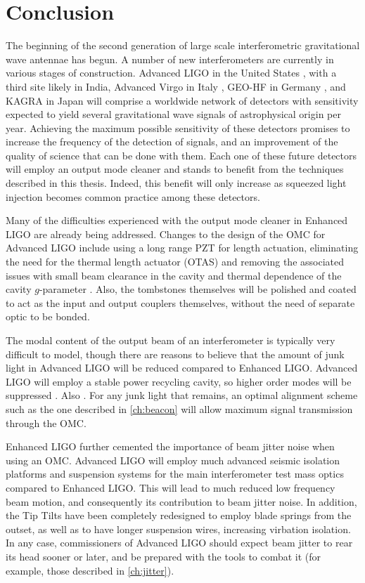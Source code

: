 \chapter{Conclusion}
\label{ch:conclusion}

The beginning of the second generation of large scale interferometric gravitational wave antennae has begun. %
A number of new interferometers are currently in various stages of construction. %
Advanced LIGO in the United States , with a third site likely in India, Advanced Virgo in Italy , GEO-HF in Germany , and KAGRA in Japan  will comprise a worldwide network of detectors with sensitivity expected to yield several gravitational wave signals of astrophysical origin per year. %
Achieving the maximum possible sensitivity of these detectors promises to increase the frequency of the detection of signals, and an improvement of the quality of science that can be done with them. %
Each one of these future detectors will employ an output mode cleaner and stands to benefit from the techniques described in this thesis. %
Indeed, this benefit will only increase as squeezed light injection becomes common practice among these detectors.

Many of the difficulties experienced with the output mode cleaner in Enhanced LIGO are already being addressed. %
Changes to the design of the OMC for Advanced LIGO include using a long range PZT for length actuation, eliminating the need for the thermal length actuator (OTAS) and removing the associated issues with small beam clearance in the cavity and thermal dependence of the cavity $g$-parameter \cite{T1000276,T0900157}. %
Also, the tombstones themselves will be polished and coated to act as the input and output couplers themselves, without the need of separate optic to be bonded. %
 

The modal content of the output beam of an interferometer is typically very difficult to model, though there are reasons to believe that the amount of junk light in Advanced LIGO will be reduced compared to Enhanced LIGO. %
Advanced LIGO will employ a stable power recycling cavity, so higher order modes will be suppressed \cite{T080208}. %
Also . %
For any junk light that remains, an optimal alignment scheme such as the one described in \ref{ch:beacon} will allow maximum signal transmission through the OMC.

Enhanced LIGO further cemented the importance of beam jitter noise when using an OMC. %
Advanced LIGO will employ much advanced seismic isolation platforms \cite{BSCISI} and suspension systems \cite{quaddesign} for the main interferometer test mass optics compared to Enhanced LIGO. %
This will lead to much reduced low frequency beam motion, and consequently its contribution to beam jitter noise. %
In addition, the Tip Tilts have been completely redesigned to employ blade springs from the outset, as well as to have longer suspension wires, increasing virbation isolation. %
In any case, commissioners of Advanced LIGO should expect beam jitter to rear its head sooner or later, and be prepared with the tools to combat it (for example, those described in \ref{ch:jitter}).

